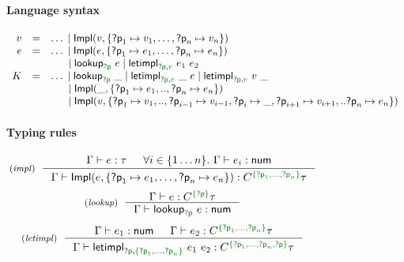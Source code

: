 \begin{figure}[h!]
\paragraph{Language syntax}

\begin{equation*}
\begin{array}{rcl}
v &=& \ldots \sep \ident{Impl}(v, \{ \ident{?p}_1\mapsto v_1, \ldots, \ident{?p}_n\mapsto v_n\}) \\
e &=& \ldots \sep \ident{Impl}(e, \{\ident{?p}_1\mapsto e_1, \ldots, \ident{?p}_n\mapsto e_n\}) \\
  && \hspace{1.4em} \sep \ident{lookup}_{\cclrd{\ident{?p}}}~e \sep \ident{letimpl}_{\cclrd{\ident{?p}}, \cclrd{r}}~e_1~e_2\\
K &=& \ldots \sep \ident{lookup}_{\cclrd{\ident{?p}}}~\_ \sep \ident{letimpl}_{\cclrd{\ident{?p}}, \cclrd{r}}~\_~e \sep \ident{letimpl}_{\cclrd{\ident{?p}}, \cclrd{r}}~v~\_ \\
  && \hspace{1.4em} \sep \ident{Impl}(\_, \{ \ident{?p}_1\mapsto e_1, .., \ident{?p}_n\mapsto e_n\})\\
  && \hspace{1.4em} \sep \ident{Impl}(v, \{ \ident{?p}_1 \mapsto v_1, .., \ident{?p}_{i-1} \mapsto v_{i-1}, \ident{?p}_i \mapsto \_, \ident{?p}_{i+1} \mapsto v_{i+1}, .. \ident{?p}_n \mapsto e_n\})
\end{array}
\end{equation*}

\vspace{1em}
\paragraph{Typing rules}

\begin{equation*}
  \hspace{-2em}
\tyrule{impl}
  { \Gamma \vdash e:\tau & \forall i\in\{ 1 \ldots n \}. ~ \Gamma \vdash e_i : \ident{num}}
  { \Gamma \vdash \ident{Impl}(e, \{ \ident{?p}_1\mapsto e_1, \ldots, \ident{?p}_n\mapsto e_n \}) : \ctyp{\cclrd{ \{ \ident{?p}_1, \ldots, \ident{?p}_n \}}}{\tau} }
\end{equation*}
\begin{equation*}
  \hspace{-2em}
\tyrule{lookup}
  { \Gamma \vdash e : \ctyp{\cclrd{ \{\ident{?p}\} }}{\tau} }
  { \Gamma \vdash \ident{lookup}_{\cclrd{\ident{?p}}}~e : \ident{num} }
\end{equation*}
\begin{equation*}
  \hspace{-2em}
\tyrule{letimpl}
  { \Gamma \vdash e_1 : \ident{num} &
    \Gamma \vdash e_2 : \ctyp{\cclrd{ \{ \ident{?p}_1, \ldots, \ident{?p}_n \} }}{\tau} }
  { \Gamma \vdash \ident{letimpl}_{\cclrd{\ident{?p}}, \cclrd{ \{ \ident{?p}_1, \ldots, \ident{?p}_n \} }}~e_1~e_2 :
      \ctyp{\cclrd{ \{ \ident{?p}_1, \ldots, \ident{?p}_n, \ident{?p} \} }}{\tau} }
\end{equation*}


\end{figure}
